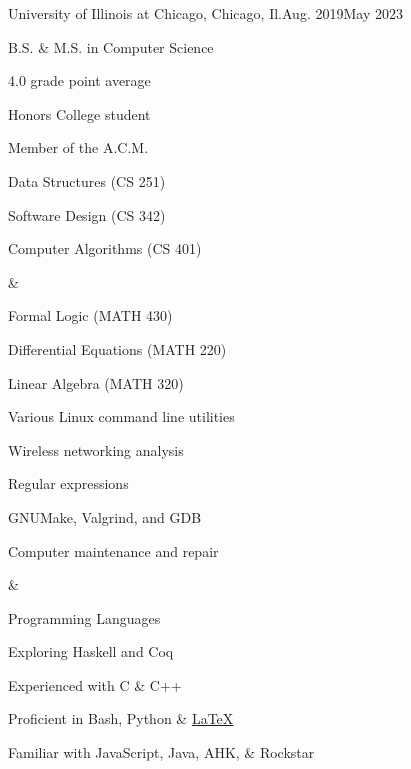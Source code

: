 \documentclass[10.5pt]{resume}
\begin{document}
\begin{Education}
	\begin{EdEntry}{University of Illinois at Chicago, Chicago, Il.}{Aug. 2019}{May 2023}
		\item B.S. \& M.S. in Computer Science 
		\item 4.0 grade point average
		\item Honors College student
		\item Member of the A.C.M.
	\end{EdEntry}
\end{Education}

\begin{Coursework}
		\begin{description}
			\item Data Structures (CS 251)
			\item Software Design (CS 342)
			\item Computer Algorithms (CS 401)
		\end{description} 
		
		&

		\begin{description}
			\item Formal Logic (MATH 430)
			\item Differential Equations (MATH 220)
			\item Linear Algebra (MATH 320)
		\end{description}
\end{Coursework}

\begin{Skills}
	\begin{description}
		\item Various Linux command line utilities
		\item Wireless networking analysis
		\item Regular expressions
		\item GNUMake, Valgrind, and GDB
		\item Computer maintenance and repair	
	\end{description} 

	&

	\begin{TitleDescription}{Programming Languages}
		\item Exploring Haskell and Coq
		\item Experienced with C \& C++
		\item Proficient in Bash, Python \& \href{https://github.com/baricus/resume}{\LaTeX{}}
		\item Familiar with JavaScript, Java, AHK, \& Rockstar
	\end{TitleDescription} 
\end{Skills}
\end{document}
